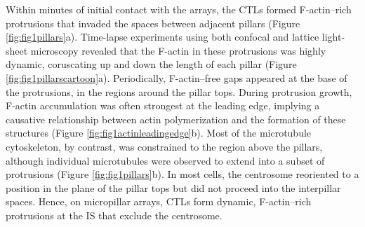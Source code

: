 Within minutes of initial contact with the arrays, the CTLs formed F-actin–rich protrusions that invaded the spaces between adjacent pillars (Figure \ref{fig:fig1pillars}a). Time-lapse experiments using both confocal and lattice light-sheet microscopy revealed that the F-actin in these protrusions was highly dynamic, coruscating up and down the length of each pillar (Figure \ref{fig:fig1pillarscartoon}a). Periodically, F-actin–free gaps appeared at the base of the protrusions, in the regions around the pillar tops. During protrusion growth, F-actin accumulation was often strongest at the leading edge, implying a causative relationship between actin polymerization and the formation of these structures (Figure \ref{fig:fig1actinleadingedge}b). Most of the microtubule cytoskeleton, by contrast, was constrained to the region above the pillars, although individual microtubules were observed to extend into a subset of protrusions (Figure \ref{fig:fig1pillars}b). In most cells, the centrosome reoriented to a position in the plane of the pillar tops but did not proceed into the interpillar spaces. Hence, on micropillar arrays, CTLs form dynamic, F-actin–rich protrusions at the IS that exclude the centrosome.

